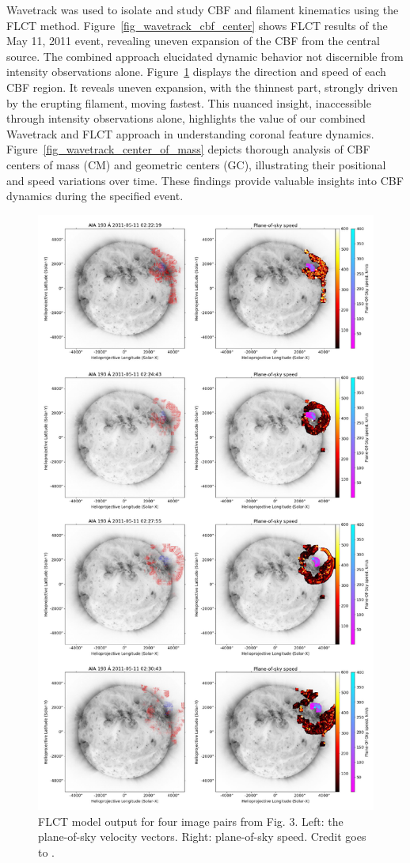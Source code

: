 Wavetrack was used to isolate and study CBF and filament kinematics using the FLCT method. Figure~\ref{fig_wavetrack_cbf_center} shows FLCT results of the May 11, 2011 event, revealing uneven expansion of the CBF from the central source. The combined approach elucidated dynamic behavior not discernible from intensity observations alone.
Figure~\ref{fig_flct_110511} displays the direction and speed of each CBF region. It reveals uneven expansion, with the thinnest part, strongly driven by the erupting filament, moving fastest. This nuanced insight, inaccessible through intensity observations alone, highlights the value of our combined Wavetrack and FLCT approach in understanding coronal feature dynamics.
Figure~\ref{fig_wavetrack_center_of_mass} depicts thorough analysis of CBF centers of mass (CM) and geometric centers (GC), illustrating their positional and speed variations over time. These findings provide valuable insights into CBF dynamics during the specified event.

\begin{figure}[!htp]
	\centering
	\includegraphics[width=0.7\hsize]{chapter2/figs/flct_wave_filament_doubleplot_figure_110511.png}
	\caption{FLCT model output for four image pairs from Fig. 3. Left: the plane-of-sky velocity vectors. Right: plane-of-sky speed. Credit goes to \citet{stepanyuk_2022}.}
	\label{fig_flct_110511}
\end{figure}

